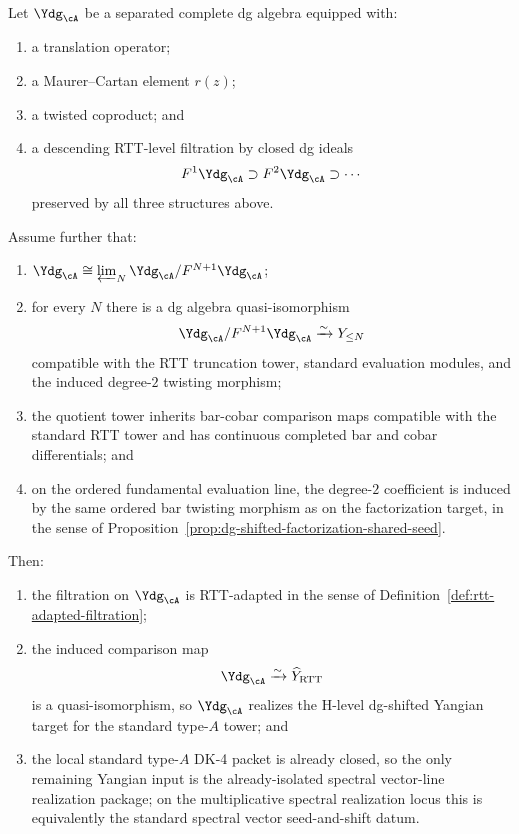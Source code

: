 \begin{proposition}
\label{prop:yangian-typea-realization-criterion}
Let $\Ydg_{\cA}$ be a separated complete dg algebra equipped with:
\begin{enumerate}[label=\textup{(\roman*)}]
\item a translation operator;
\item a Maurer--Cartan element $r(z)$;
\item a twisted coproduct; and
\item a descending RTT-level filtration by closed dg ideals
 \[
 F^1\Ydg_{\cA} \supset F^2\Ydg_{\cA} \supset \cdots
 \]
 preserved by all three structures above.
\end{enumerate}
Assume further that:
\begin{enumerate}[label=\textup{(\roman*)},resume]
\item $\Ydg_{\cA}\cong \varprojlim_N \Ydg_{\cA}/F^{N+1}\Ydg_{\cA}$;
\item for every $N$ there is a dg algebra quasi-isomorphism
 \[
 \Ydg_{\cA}/F^{N+1}\Ydg_{\cA}\xrightarrow{\sim}Y_{\le N}
 \]
 compatible with the RTT truncation tower, standard evaluation
 modules, and the induced degree-$2$ twisting morphism;
\item the quotient tower inherits bar-cobar comparison maps compatible
 with the standard RTT tower and has continuous completed bar and
 cobar differentials; and
\item on the ordered fundamental evaluation line, the degree-$2$
 coefficient is induced by the same ordered bar twisting morphism as
 on the factorization target, in the sense of
 Proposition~\ref{prop:dg-shifted-factorization-shared-seed}.
\end{enumerate}
Then:
\begin{enumerate}[label=\textup{(\alph*)}]
\item the filtration on $\Ydg_{\cA}$ is RTT-adapted in the sense of
 Definition~\ref{def:rtt-adapted-filtration};
\item the induced comparison map
 \[
 \Ydg_{\cA}\xrightarrow{\sim}\widehat Y_{\mathrm{RTT}}
 \]
 is a quasi-isomorphism, so $\Ydg_{\cA}$ realizes the H-level
 dg-shifted Yangian target for the standard type-$A$ tower; and
\item the local standard type-$A$ DK-4 packet is already closed, so the
 only remaining Yangian input is the already-isolated spectral
 vector-line realization package; on the multiplicative spectral
 realization locus this is equivalently the standard spectral vector
 seed-and-shift datum.
\end{enumerate}
\end{proposition}

